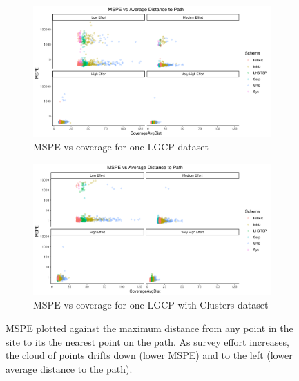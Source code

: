\documentclass[review]{elsarticle}
\begin{document}
\begin{figure}

\begin{subfigure}{5in}
\includegraphics[width=5in]{../graphics/MSPE-Coverage-LGCP000004.png}
\caption{MSPE vs coverage for one LGCP dataset}
\label{covglgcp}
\end{subfigure}

\begin{subfigure}{5in}
\includegraphics[width=5in]{../graphics/MSPE-Coverage-Cluster000004.png}
\caption{MSPE vs coverage for one LGCP with Clusters dataset}
\label{covgclust}
\end{subfigure}

\caption{MSPE plotted against the maximum distance from any point in the site
to its the nearest point on the path. As survey effort increases, the cloud of
points drifts down (lower MSPE) and to the left (lower average distance to the
path).}
\label{covg}
\end{figure}

\end{document}
